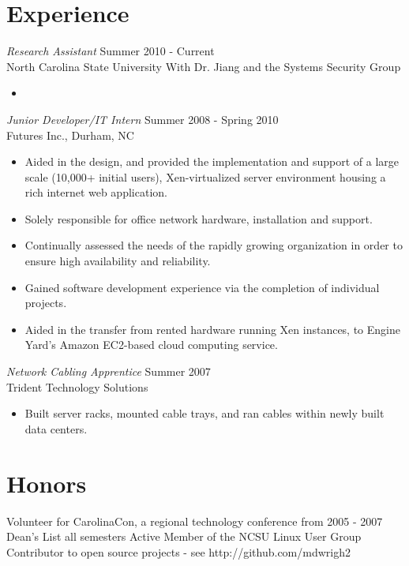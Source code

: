 \documentclass[margin]{res}
\begin{document}
\begin{resume}
\section{\sc Experience} 
    {\sl Research Assistant} \hfill Summer 2010 - Current \\
    North Carolina State University
    With Dr. Jiang and the Systems Security Group
    \begin{itemize} \itemsep -2pt %
      \item 
    \end{itemize}
    {\sl Junior Developer/IT Intern} \hfill Summer 2008 - Spring 2010 \\
		Futures Inc., Durham, NC
    \begin{itemize}  \itemsep -2pt %
        \item Aided in the design, and provided the implementation and support of a large scale (10,000+ initial users), Xen-virtualized server environment housing a rich internet web application.
        \item   Solely responsible for office network hardware, installation and support.  

	      \item Continually assessed the needs of the rapidly growing organization in order to ensure high availability and reliability. 
	      \item Gained software development experience via the completion of individual projects.
        \item Aided in the transfer from rented hardware running Xen instances, to
              Engine Yard's Amazon EC2-based cloud computing service.
    \end{itemize}
    {\sl Network Cabling Apprentice} \hfill            Summer 2007 \\
    Trident Technology Solutions
    \begin{itemize}  \itemsep -2pt %
      \item Built server racks, mounted cable trays, and ran cables within newly built data centers.
    \end{itemize} 
 
\section{\sc Honors}
  Volunteer for CarolinaCon, a regional technology conference from 2005 - 2007\\
  Dean's List all semesters
  Active Member of the NCSU Linux User Group
  Contributor to open source projects - see http://github.com/mdwrigh2

 

\end{resume}
\end{document}
